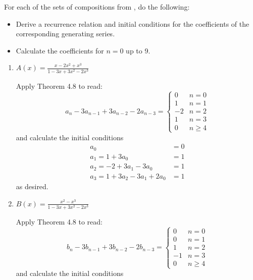 \documentclass[class=math239,notes,tikz]{agony}
\begin{document}
\begin{xca}
  For each of the sets of compositions from , do the following:
  \begin{itemize}[nosep]
    \item Derive a recurrence relation and initial conditions for the coefficients of the corresponding generating series.
    \item Calculate the coefficients for $n=0$ up to 9.
  \end{itemize}
\end{xca}
\begin{enumerate}
  \item $A(x) = \frac{x-2x^2+x^3}{1-3x+3x^2-2x^3}$
        \begin{sol}
          Apply Theorem 4.8 to read:
          \[
            a_n - 3a_{n-1} + 3a_{n-2} - 2a_{n-3} = \begin{cases}
              0  & n = 0    \\
              1  & n = 1    \\
              -2 & n = 2    \\
              1  & n = 3    \\
              0  & n \geq 4
            \end{cases}
          \]
          and calculate the initial conditions
          \begin{align*}
            a_0                          & = 0 \\
            a_1 = 1 + 3a_0               & = 1 \\
            a_2 = -2 + 3a_1 - 3a_0       & = 1 \\
            a_3 = 1 + 3a_2 - 3a_1 + 2a_0 & = 1
          \end{align*}
          as desired.
        \end{sol}
  \item $B(x) = \frac{x^2-x^3}{1-3x+3x^2-2x^3}$
        \begin{sol}
          Apply Theorem 4.8 to read:
          \[
            b_n - 3b_{n-1} + 3b_{n-2} - 2b_{n-3} = \begin{cases}
              0  & n = 0    \\
              0  & n = 1    \\
              1  & n = 2    \\
              -1 & n = 3    \\
              0  & n \geq 4
            \end{cases}
          \]
          and calculate the initial conditions

\end{sol}
\end{enumerate}
\end{document}
